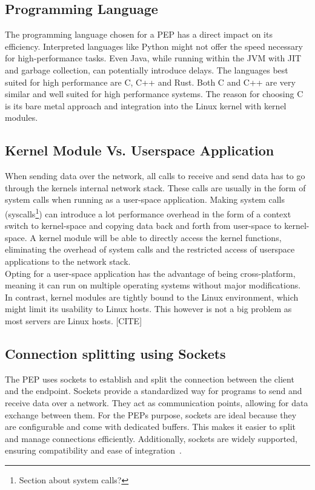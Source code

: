 \documentclass[a4paper,english, 11pt]{report}
\begin{document}
\subsection{Programming Language}
The programming language chosen for a PEP has a direct impact on its efficiency. Interpreted languages like Python might not offer the speed necessary for high-performance tasks. Even Java, while running within the JVM with JIT and garbage collection, can potentially introduce delays. The languages best suited for high performance are C, C++ and Rust. Both C and C++ are very similar and well suited for high performance systems. The reason for choosing C is its bare metal approach and integration into the Linux kernel with kernel modules.

\subsection{Kernel Module Vs. Userspace Application}
When sending data over the network, all calls to receive and send data has to go through the kernels internal network stack. These calls are usually in the form of system calls when running as a user-space application. Making system calls (syscalls\footnote{Section about system calls?}) can introduce a lot performance overhead in the form of a context switch to kernel-space and copying data back and forth from user-space to kernel-space. A kernel module will be able to directly access the kernel functions, eliminating the overhead of system calls and the restricted access of userspace applications to the network stack.\\

Opting for a user-space application has the advantage of being cross-platform, meaning it can run on multiple operating systems without major modifications. In contrast, kernel modules are tightly bound to the Linux environment, which might limit its usability to Linux hosts. This however is not a big problem as most servers are Linux hosts. [CITE]

\subsection{Connection splitting using Sockets}%
The PEP uses sockets to establish and split the connection between the client and the endpoint. Sockets provide a standardized way for programs to send and receive data over a network. They act as communication points, allowing for data exchange between them. For the PEPs purpose, sockets are ideal because they are configurable and come with dedicated buffers. This makes it easier to split and manage connections efficiently. Additionally, sockets are widely supported, ensuring compatibility and ease of integration~\cite{ibm_doc}.\\
\end{document}

